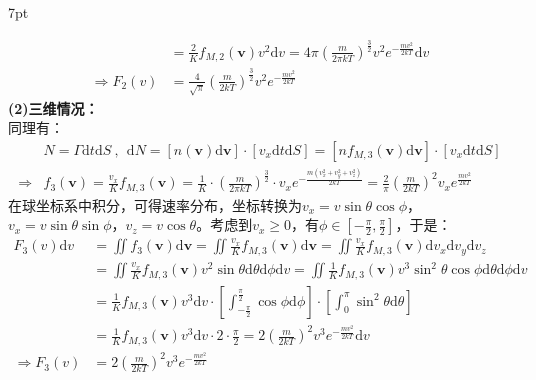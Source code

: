 \documentclass[zihao=-4,UTF8]{report}
\newenvironment{graybox}{%
\def\FrameCommand{%
\hspace{1pt}%
{\color{gray}\small \vrule width 2pt}%
{\color{graybox_color}\vrule width 4pt}%
\colorbox{graybox_color}%
}%
\MakeFramed{\advance\hsize-\width\FrameRestore}%
\noindent\hspace{-4.55pt}%
\begin{adjustwidth}{}{7pt}%
\vspace{2pt}\vspace{2pt}%
}
{%
\vspace{2pt}\end{adjustwidth}\endMakeFramed%
}
\begin{document}
\begin{graybox}
\begin{align*}
     &= \frac{2}{K}f_{M,2}(\boldsymbol{v}) v^2 \mathrm{d}v  = 4\pi \left( \frac{m}{2\pi kT}\right)^{\frac{3}{2}}v^2e^{-\frac{mv^2}{2kT}} \mathrm{d}v \\
    \Longrightarrow
    F_2(v) & = \frac{4}{\sqrt{\pi}}\left(\frac{m}{2kT} \right)^{\frac{3}{2}}v^2e^{-\frac{mv^2}{2kT}} 
\end{align*}
\textbf{(2)三维情况：}\\
同理有：
\begin{align*}
&N = \Gamma\mathrm{d}t\mathrm{d}S \ ,\ \ \mathrm{d}N = [n(\boldsymbol{v})\mathrm{d}\boldsymbol{v}]\cdot [v_x\mathrm{d}t\mathrm{d}S] = \left[ nf_{M,3}(\boldsymbol{v})\mathrm{d}\boldsymbol{v}  \right]\cdot \left[ v_x \mathrm{d}t\mathrm{d}S \right]\\
\Longrightarrow & f_3(\boldsymbol{v}) = \frac{v_x}{K}f_{M,3}(\boldsymbol{v}) = \frac{1}{K}\cdot \left(\frac{m}{2\pi kT} \right)^{\frac{3}{2}}\cdot v_xe^{-\frac{m(v_x^2 + v_y^2 + v_z^2)}{2kT}}
 = \frac{2}{\pi} \left( \frac{m}{2kT}\right)^2 v_x e^{\frac{mv^2}{2kT}}\end{align*}
在球坐标系中积分，可得速率分布，坐标转换为$v_x = v \sin\theta \cos \phi$，$v_x = v \sin\theta \sin \phi$，$v_z = v\cos \theta$。考虑到$v_x \ge 0 $，有$\phi \in [-\frac{\pi}{2}, \frac{\pi}{2}]$，于是：
\begin{align*}
    F_3(v)\mathrm{d}v 
    &=  \iint f_3(\boldsymbol{v}) \mathrm{d}\boldsymbol{v} 
    = \iint \frac{v_x}{K}f_{M,3}(\boldsymbol{v}) \mathrm{d}\boldsymbol{v}  
    = \iint \frac{v_x}{K}f_{M,3}(\boldsymbol{v}) \mathrm{d}v_x\mathrm{d}v_y\mathrm{d}v_z\\
    & = \iint \frac{v_x}{K}f_{M,3}(\boldsymbol{v})v^2 \sin \theta \mathrm{d}\theta \mathrm{d}\phi \mathrm{d}v  
    = \iint \frac{1}{K}f_{M,3}(\boldsymbol{v}) v^3 \sin^2 \theta \cos \phi \mathrm{d}\theta \mathrm{d}\phi \mathrm{d}v  \\
    &= \frac{1}{K} f_{M,3}(\boldsymbol{v})v^3\mathrm{d}v \cdot \left[ \int_{-\frac{\pi}{2}}^{\frac{\pi}{2}} \cos \phi \mathrm{d}\phi\right] \cdot \left[\int_{0}^{\pi}\sin^2 \theta  \mathrm{d} \theta\right] \\
    &= \frac{1}{K} f_{M,3}(\boldsymbol{v})v^3\mathrm{d}v \cdot 2 \cdot \frac{\pi}{2}  = 2 \left(\frac{m}{2kT} \right)^2 v^3 e^{-\frac{mv^2}{2kT}} \mathrm{d}v\\
    \Longrightarrow  F_3(v) &= 2 \left(\frac{m}{2kT} \right)^2 v^3 e^{-\frac{mv^2}{2kT}} 
\end{align*}\noindent
\end{graybox}
\end{document}
